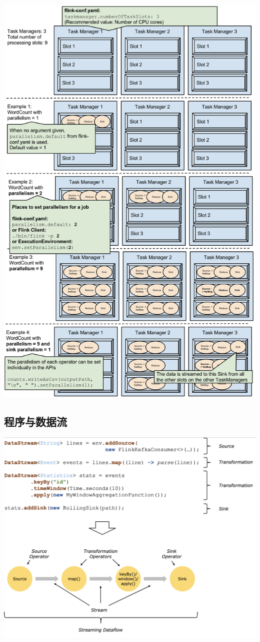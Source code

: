 \documentclass{ctexart}
\begin{document}
\includegraphics[width=\textwidth]{slots_parallelism.png}

\subsection{程序与数据流}

\includegraphics[width=\textwidth]{program_dataflow.png}
\end{document}
